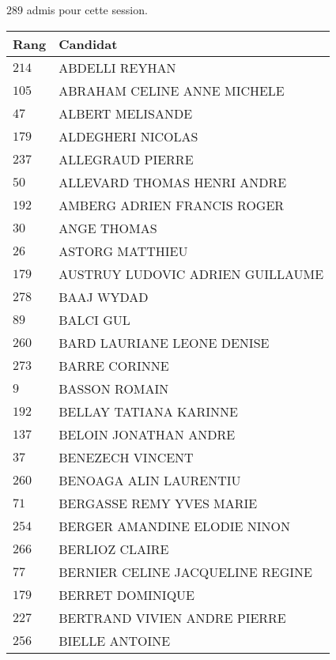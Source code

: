 




  $289$ admis pour cette session.

  \begin{xltabular}{\linewidth}{|l|X|}
    \hline
    \textbf{Rang} & \textbf{Candidat} \\
    \hline
    $214$ & ABDELLI REYHAN \\
    \hline
    $105$ & ABRAHAM CELINE ANNE MICHELE \\
    \hline
    $47$ & ALBERT MELISANDE \\
    \hline
    $179$ & ALDEGHERI NICOLAS \\
    \hline
    $237$ & ALLEGRAUD PIERRE \\
    \hline
    $50$ & ALLEVARD THOMAS HENRI ANDRE \\
    \hline
    $192$ & AMBERG ADRIEN FRANCIS ROGER \\
    \hline
    $30$ & ANGE THOMAS \\
    \hline
    $26$ & ASTORG MATTHIEU \\
    \hline
    $179$ & AUSTRUY LUDOVIC ADRIEN GUILLAUME \\
    \hline
    $278$ & BAAJ WYDAD \\
    \hline
    $89$ & BALCI GUL \\
    \hline
    $260$ & BARD LAURIANE LEONE DENISE \\
    \hline
    $273$ & BARRE CORINNE \\
    \hline
    $9$ & BASSON ROMAIN \\
    \hline
    $192$ & BELLAY TATIANA KARINNE \\
    \hline
    $137$ & BELOIN JONATHAN ANDRE \\
    \hline
    $37$ & BENEZECH VINCENT \\
    \hline
    $260$ & BENOAGA ALIN LAURENTIU \\
    \hline
    $71$ & BERGASSE REMY YVES MARIE \\
    \hline
    $254$ & BERGER AMANDINE ELODIE NINON \\
    \hline
    $266$ & BERLIOZ CLAIRE \\
    \hline
    $77$ & BERNIER CELINE JACQUELINE REGINE \\
    \hline
    $179$ & BERRET DOMINIQUE \\
    \hline
    $227$ & BERTRAND VIVIEN ANDRE PIERRE \\
    \hline
    $256$ & BIELLE ANTOINE \\

\end{xltabular}
